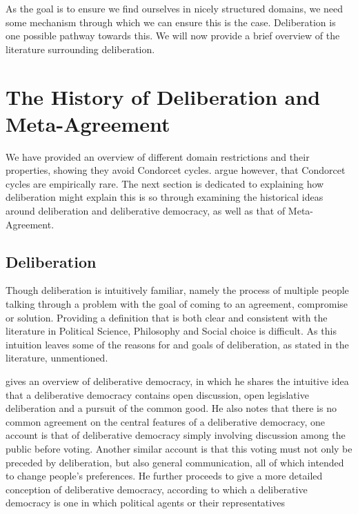 As the goal is to ensure we find ourselves in nicely structured domains, we
need some mechanism through which we can ensure this is the case. Deliberation
is one possible pathway towards this. We will now provide a brief overview of the
literature surrounding deliberation.

\section{The History of Deliberation and Meta-Agreement}

We have provided an overview of different domain restrictions and their
properties, showing they avoid Condorcet cycles.
\citet{bochslerMarquisCondorcetGoes2010} argue however, that Condorcet cycles
are empirically rare. The next section is dedicated to explaining how
deliberation might explain this is so through examining the historical ideas
around deliberation and deliberative democracy, as well as that of
Meta-Agreement.

\subsection{Deliberation}

Though deliberation is intuitively familiar, namely
the process of multiple people talking through a problem with the goal of
coming to an agreement, compromise or solution. Providing a definition that is
both clear and consistent with the literature in Political Science, Philosophy
and Social choice is difficult.  As this intuition leaves some of the reasons for
and goals of deliberation, as stated in the literature, unmentioned.



\citet{freemanDeliberativeDemocracySympathetic2000} gives an overview of deliberative democracy, in which he shares the intuitive idea that a deliberative democracy contains open discussion, open legislative deliberation and a pursuit of the common good. He also notes that there is no common agreement on the central features of a deliberative democracy, one account is that of deliberative democracy simply involving discussion among the public before voting. Another similar account is that this voting must not only be preceded by deliberation, but also general communication, all of which intended to change people's preferences. He further proceeds to give a more detailed conception of deliberative democracy, according to which a deliberative democracy is one in which political agents or their representatives

